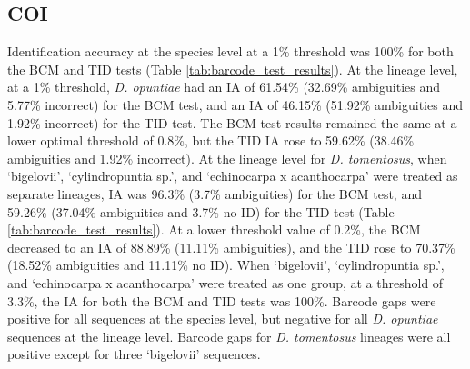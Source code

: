 \subsection{COI}
Identification accuracy at the species level at a 1\% threshold was 100\% for both the BCM and TID tests (Table \ref{tab:barcode_test_results}). At the lineage level, at a 1\% threshold, \textit{D. opuntiae} had an IA of 61.54\% (32.69\% ambiguities and 5.77\% incorrect) for the BCM test, and an IA of 46.15\% (51.92\% ambiguities and 1.92\% incorrect) for the TID test. The BCM test results remained the same at a lower optimal threshold of 0.8\%, but the TID IA rose to 59.62\% (38.46\% ambiguities and 1.92\% incorrect). 
At the lineage level for \textit{D. tomentosus}, when `bigelovii', `cylindropuntia sp.', and `echinocarpa x acanthocarpa' were treated as separate lineages, IA was 96.3\% (3.7\% ambiguities) for the BCM test, and 59.26\% (37.04\% ambiguities and 3.7\% no ID) for the TID test (Table \ref{tab:barcode_test_results}). At a lower threshold value of 0.2\%, the BCM decreased to an IA of 88.89\% (11.11\% ambiguities), and the TID rose to 70.37\% (18.52\% ambiguities and 11.11\% no ID). When `bigelovii', `cylindropuntia sp.', and `echinocarpa x acanthocarpa' were treated as one group, at a threshold of 3.3\%, the IA for both the BCM and TID tests was 100\%. 
Barcode gaps were positive for all sequences at the species level, but negative for all \textit{D. opuntiae} sequences at the lineage level. Barcode gaps for \textit{D. tomentosus} lineages were all positive except for three `bigelovii' sequences.

